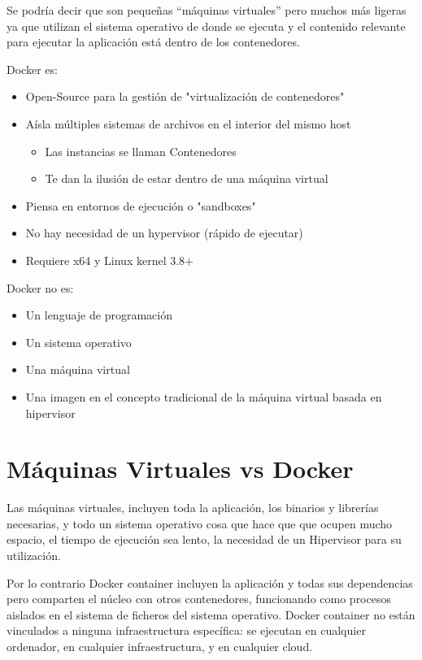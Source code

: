 Se podría decir que son pequeñas “máquinas virtuales” pero muchos más ligeras ya que utilizan el sistema operativo de donde se ejecuta y el contenido relevante para ejecutar la aplicación está dentro de los contenedores.
\newline 

Docker es:

\begin{itemize}
\item Open-Source para la gestión de "virtualización de contenedores"
\item Aísla múltiples sistemas de archivos en el interior del mismo host
\begin{itemize}
\item Las instancias se llaman Contenedores
\item Te dan la ilusión de estar dentro de una máquina virtual
\end{itemize}
\item Piensa en entornos de ejecución o "sandboxes"
\item No hay necesidad de un hypervisor (rápido de ejecutar)
\item Requiere x64 y Linux kernel 3.8+
\end{itemize}
\pagebreak 
Docker no es:

\begin{itemize}
\item Un lenguaje de programación
\item Un sistema operativo
\item Una máquina virtual
\item Una imagen en el concepto tradicional de la máquina virtual basada en hipervisor
\end{itemize}

\section{Máquinas Virtuales vs Docker}

Las máquinas virtuales, incluyen toda la aplicación, los binarios y librerías necesarias, y todo un sistema operativo cosa que hace que que ocupen mucho espacio, el tiempo de ejecución sea lento, la necesidad de un Hipervisor para su utilización.

Por lo contrario Docker container incluyen la aplicación y todas sus dependencias pero comparten el núcleo con otros contenedores, funcionando como procesos aislados en el sistema de ficheros del sistema operativo. Docker container no están vinculados a ninguna infraestructura específica: se ejecutan en cualquier ordenador, en cualquier infraestructura, y en cualquier cloud.

